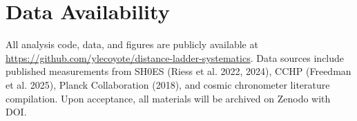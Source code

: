 \documentclass[twocolumn, linenumbers]{aastex701}
\begin{document}

\section*{Data Availability}

All analysis code, data, and figures are publicly available at \url{https://github.com/ylecoyote/distance-ladder-systematics}.
Data sources include published measurements from SH0ES (Riess et al. 2022, 2024),
CCHP (Freedman et al. 2025), Planck Collaboration (2018), and cosmic chronometer
literature compilation. Upon acceptance, all materials will be archived on Zenodo with DOI.





\end{document}
